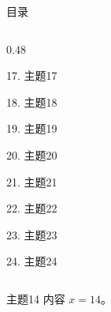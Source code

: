 \documentclass[aspectratio=169,10pt,fontset=fandol]{ctexbeamer}
\begin{document}
\begin{frame}[t,fragile]{目录}
\begin{columns}[T,onlytextwidth]
\begin{column}{0.48\textwidth}
{\color{gray!40}\small 17. 主题17\par}\vspace{0.22em}
{\color{gray!40}\small 18. 主题18\par}\vspace{0.22em}
{\color{gray!40}\small 19. 主题19\par}\vspace{0.22em}
{\color{gray!40}\small 20. 主题20\par}\vspace{0.22em}
{\color{gray!40}\small 21. 主题21\par}\vspace{0.22em}
{\color{gray!40}\small 22. 主题22\par}\vspace{0.22em}
{\color{gray!40}\small 23. 主题23\par}\vspace{0.22em}
{\color{gray!40}\small 24. 主题24\par}\vspace{0.22em}
\end{column}
\end{columns}
\end{frame}
\begin{frame}[t,fragile]{主题14}
\normalsize
{\normalsize
内容 $x=14$。
}
\end{frame}
\end{document}

